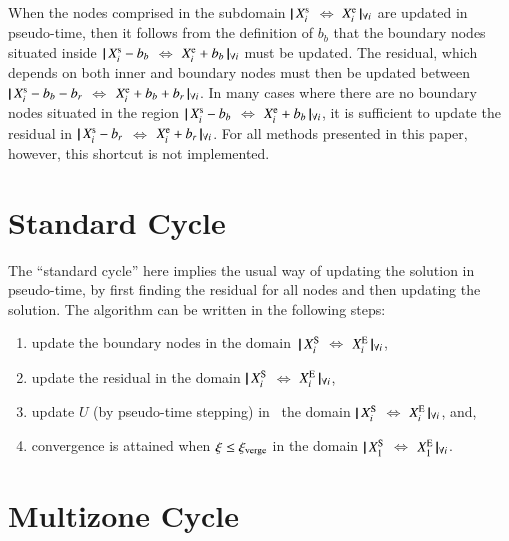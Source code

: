 \documentclass{warpdoc}
\newcommand{\bb}{{b_b}}
\newcommand{\br}{{b_r}}
\newcommand{\loope}{{\rm e}}
\newcommand{\loops}{{\rm s}}
\newcommand{\loopE}{{\rm E}}
\newcommand{\loopS}{{\rm S}}
\newcommand{\xiverge}{{\xi_{\rm verge}}}
\newcommand\subdomain[3]{$ | \! | \, #2 $ $\Leftrightarrow$ $#3 \, | \! |_{#1}$}
\begin{document}
When the nodes comprised in the subdomain \subdomain{\forall i}{X_i^\loops}{X_i^\loope} are
updated in pseudo-time, then it follows from the definition of $\bb$
that the boundary nodes situated inside \subdomain{\forall i}{X_i^\loops-\bb}{X_i^\loope +\bb}
must be updated. The residual, which depends on both inner and boundary nodes
must then be updated between \subdomain{\forall i}{X_i^\loops-\bb-\br}{X_i^\loope +\bb+\br}.
In many cases where there are no boundary nodes situated in the region
\subdomain{\forall i}{X_i^\loops-\bb}{X_i^\loope+\bb}, it is sufficient to update the residual
in \subdomain{\forall i}{X_i^\loops-\br}{X_i^\loope+\br}. For all methods presented in this
paper, however, this shortcut is not implemented.



\section{Standard Cycle}

The ``standard cycle'' here implies the usual way of updating the solution
in pseudo-time, by first finding the residual for all nodes and then updating
the solution. The algorithm can be written in the following steps:
%
\begin{enumerate}
  \item{update the boundary nodes in the domain\
        \subdomain{\forall i}{X^{\loopS}_i}{X^{\loopE}_i},}
  \item{update the residual in the domain
        \subdomain{\forall i}{X^{\loopS}_i}{X^{\loopE}_i}, }
  \item{update $U$ (by pseudo-time stepping) in \
        the domain \subdomain{\forall i}{X^{\loopS}_i}{X^{\loopE}_i}, and,}
  \item{convergence is attained when $\xi \leq \xiverge$ in the domain \subdomain{\forall i}{X^{\loopS}_1}{X^{\loopE}_1}.}
\end{enumerate}
%



\section{Multizone Cycle}
\label{section:multizone}
\end{document}
